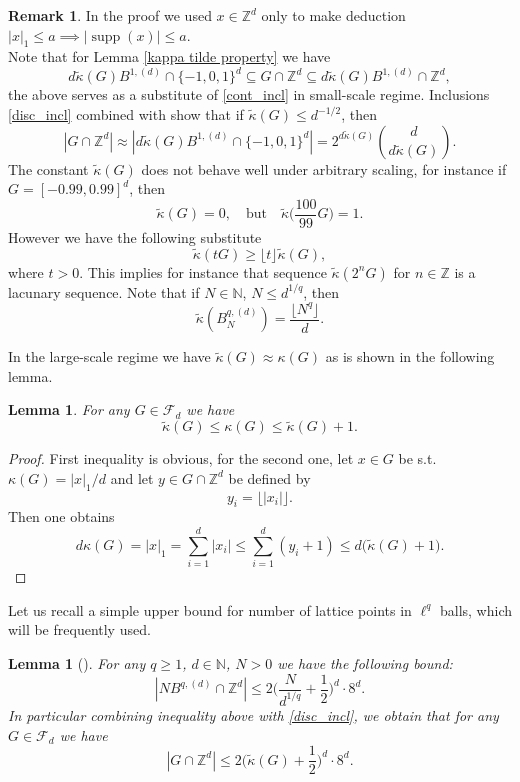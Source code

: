 \documentclass[a4paper,oneside, reqno]{amsart}
\numberwithin{equation}{section}
\newtheorem{Lem}[Thm]{Lemma}
\theoremstyle{definition}%
\newtheorem{Rem}[Thm]{Remark}
\theoremstyle{definition}
\theoremstyle{definition}%
\theoremstyle{definition}
\newcommand{\Z}{\mathbb{Z}}
\newcommand{\N}{\mathbb{N}}
\DeclareMathOperator{\supp}{supp}
\begin{document}
\begin{Rem}
    In the proof we used $x \in \Z^d$ only to make deduction $|x|_1 \le a \implies |\supp(x)| \le a$. \\
    Note that for Lemma \ref{kappa tilde property} we have 
    \begin{equation} \label{disc_incl}
        d \widetilde{\kappa}(G) B^{1,(d)} \cap \{-1,0,1 \}^d \subseteq G \cap \Z^d \subseteq d \widetilde{\kappa}(G) B^{1,(d)} \cap \Z^d,
    \end{equation}
    the above serves as a substitute of \eqref{cont_incl} in small-scale regime. Inclusions \eqref{disc_incl} combined with \cite[Corollary 1.8]{KNW} show that if $\widetilde{\kappa}(G) \le d^{-1/2}$, then 
    \[
    |G \cap \Z^d| \approx |d \widetilde{\kappa}(G) B^{1,(d)} \cap \{-1,0,1 \}^d|= 2^{d \widetilde{\kappa}(G)} \binom{d}{d \widetilde{\kappa}(G)}.
    \]
    The constant $\widetilde{\kappa}(G)$ does not behave well under arbitrary scaling, for instance if $G=[-0.99,0.99]^d$, then
    \[
    \widetilde{\kappa}(G)=0, \quad \text{but} \quad \widetilde{\kappa}\Big(\frac{100}{99}G \Big)=1.
    \]
    However we have the following substitute 
    \[
    \widetilde{\kappa}(tG) \ge \lfloor t \rfloor \widetilde{\kappa}(G),
    \]
    where $t>0$. This implies for instance that sequence $\widetilde{\kappa}(2^nG)$ for $n \in \Z$ is a lacunary sequence. Note that if $N \in \N$, $N\le d^{1/q}$, then
    \[
    \widetilde{\kappa}(B_N^{q,(d)})= \frac{\lfloor N^q \rfloor}{d}.
    \]
\end{Rem}
    In the large-scale regime we have $\widetilde{\kappa}(G) \approx\kappa(G)$ as is shown in the following lemma. 
\begin{Lem} \label{tilde kappa comparable to kappa in large scale}
 For any $G \in \mathcal{F}_d$ we have
 \[
 \widetilde{\kappa}(G) \le \kappa(G) \le \widetilde{\kappa}(G)+1.
 \]
\end{Lem}
\begin{proof}
First inequality is obvious, for the second one, let $x \in G$ be s.t. $\kappa(G)=|x|_1/d$ and let $y \in G \cap \Z^d$ be defined by 
\[
y_i= \lfloor |x_i| \rfloor.
\]
Then one obtains
\[
d\kappa(G)=|x|_1 = \sum_{i=1}^d |x_i| \le  \sum_{i=1}^d (y_i+1) \le d \big( \widetilde{\kappa}(G)+1 \big).
\]
\end{proof}
Let us recall a simple upper bound for number of lattice points in $\ell^q$ balls, which will be frequently used.
\begin{Lem}[{\cite[Corollary 2.2]{Ni2}}] \label{Cor 2.2 from my lq paper}
    For any $q \ge 1$, $d \in \N$, $N>0$ we have the following bound:
    \[
    |NB^{q,(d)} \cap \Z^d| \le 2 \Big( \frac{N}{d^{1/q}}+ \frac{1}{2} \Big)^d \cdot 8^d.
    \]
    In particular combining inequality above with \eqref{disc_incl}, we obtain that for any $G \in \mathcal{F}_d$ we have
    \[
    |G \cap \Z^d| \le 2 \Big( \widetilde{\kappa}(G)+ \frac{1}{2} \Big)^d \cdot 8^d.
    \]
\end{Lem}
\end{document}
